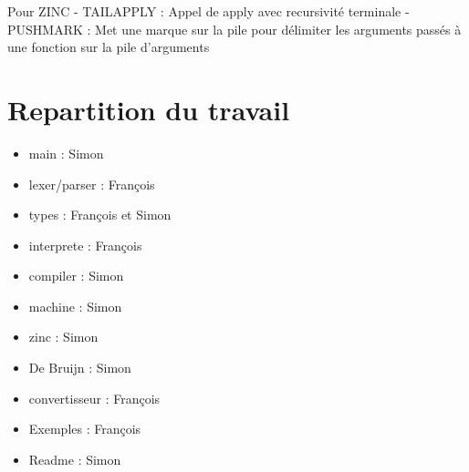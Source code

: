 Pour ZINC - TAILAPPLY : Appel de apply avec recursivité terminale -
PUSHMARK : Met une marque sur la pile pour délimiter les arguments
passés à une fonction sur la pile d'arguments

\section{Repartition du travail}\label{repartition-du-travail}

\begin{itemize}
\tightlist
\item
  main : Simon
\item
  lexer/parser : François
\item
  types : François et Simon
\item
  interprete : François
\item
  compiler : Simon
\item
  machine : Simon
\item
  zinc : Simon
\item
  De Bruijn : Simon
\item
  convertisseur : François
\item
  Exemples : François
\item
  Readme : Simon
\end{itemize}
